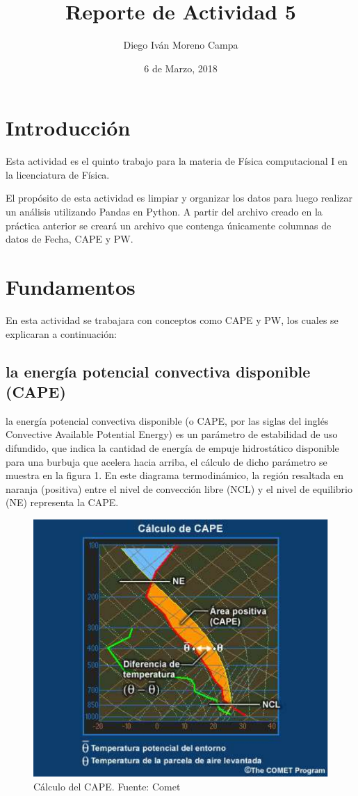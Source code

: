 \documentclass{article}
\title{Reporte de Actividad 5}
\author{Diego Iván Moreno Campa}
\date{6 de Marzo, 2018}
\begin{document}
\maketitle

\bigskip

\section{Introducción}

Esta actividad es el quinto trabajo para la materia de Física computacional I en la licenciatura de Física.

El propósito de esta actividad es limpiar y organizar los datos para luego realizar un análisis utilizando Pandas en Python. A partir del archivo creado en la práctica anterior se creará un archivo que contenga únicamente columnas de datos de Fecha, CAPE y PW.

\section{Fundamentos}

En esta actividad se trabajara con conceptos como CAPE y PW, los cuales se explicaran a continuación:

\subsection{la energía potencial convectiva disponible (CAPE)}

la energía potencial convectiva disponible (o CAPE, por las siglas del inglés Convective Available Potential Energy) es un parámetro de estabilidad de uso difundido, que indica la cantidad de energía de empuje hidrostático disponible para una burbuja que acelera hacia arriba, el cálculo de dicho parámetro se muestra  en la figura 1. En este diagrama termodinámico, la región resaltada en naranja (positiva) entre el nivel de convección libre (NCL) y el nivel de equilibrio (NE) representa la CAPE.

\begin{figure}[ht!]
\centering
\includegraphics[width=0.6\linewidth]{cape.png}
\caption{Cálculo del CAPE. Fuente: Comet}
\end{figure}
\end{document}
